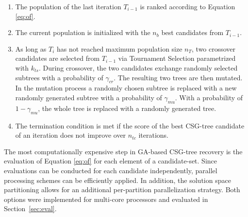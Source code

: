 \begin{enumerate}
\item The population of the last iteration $T_{i-1}$ is ranked according to Equation \ref{eq:of}.
\item The current population is initialized with the $n_b$ best candidates from $T_{i-1}$.
\item As long as $T_i$ has not reached maximum population size $n_T$, two crossover candidates are selected from $T_{i-1}$ via Tournament Selection \cite{miller95genetic} parametrized with $k_{ts}$.
During crossover, the two candidates exchange randomly selected subtrees with a probability of $\gamma_{cr}$.
The resulting two trees are then mutated. 
In the mutation process a randomly chosen subtree is replaced with a new randomly generated subtree with a probability of $\gamma_{mu}$.
With a probability of $1-\gamma_{mu}$, the whole tree is replaced with a randomly generated tree.
\item The termination condition is met if the score of the best \ac{CSG}-tree candidate of an iteration does not improve over $n_{tc}$ iterations.  	 
\end{enumerate}  
The most computationally expensive step in \ac{GA}-based \ac{CSG}-tree recovery is the evaluation of Equation \ref{eq:of} for each element of a candidate-set. 
Since evaluations can be conducted for each candidate independently, parallel processing schemes can be efficiently applied.  
In addition, the solution space partitioning allows for an additional per-partition parallelization strategy.
Both options were implemented for multi-core processors and evaluated in Section~\ref{sec:eval}.
